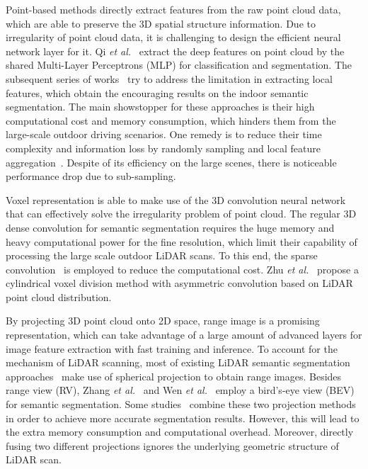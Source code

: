 \documentclass[letterpaper, 10 pt, journal, twoside]{ieeetran}
\begin{document}
Point-based methods directly extract features from the raw point cloud data, which are able to preserve the 3D spatial structure information. Due to irregularity of point cloud data, it is challenging to design the efficient neural network layer for it. Qi \textit{et al.}~\cite{qi2017pointnet} extract the deep features on point cloud by the shared Multi-Layer Perceptrons (MLP) for classification and segmentation. The subsequent series of works~\cite{qi2017pointnet++,thomas2019kpconv} try to address the limitation in extracting local features, which obtain the encouraging results on the indoor semantic segmentation. The main showstopper for these approaches is their high computational cost and memory consumption, which hinders them from the large-scale outdoor driving scenarios. One remedy is to reduce their time complexity and information loss by randomly sampling and local feature aggregation~\cite{hu2020randla}. Despite of its efficiency on the large scenes, there is noticeable performance drop due to sub-sampling.


Voxel representation is able to make use of the 3D convolution neural network that can effectively solve the irregularity problem of point cloud. The regular 3D dense convolution for semantic segmentation requires the huge memory and heavy computational power for the fine resolution, which limit their capability of processing the large scale outdoor LiDAR scans. To this end, the sparse convolution~\cite{graham20183d, yan2021sparse} is employed to reduce the computational cost. Zhu \textit{et al.}~\cite{zhu2021cylindrical} propose a cylindrical voxel division method with asymmetric convolution based on LiDAR point cloud distribution.


By projecting 3D point cloud onto 2D space, range image is a promising representation, which can take advantage of a large amount of advanced layers for image feature extraction with fast training and inference. To account for the mechanism of LiDAR scanning, most of existing LiDAR semantic segmentation approaches~\cite{milioto2019rangenet++,cortinhal2020salsanext,xu2020squeezesegv3, alonso20203d} make use of spherical projection to obtain range images. Besides range view (RV), Zhang \textit{et al.}~\cite{zhang2020polarnet} and Wen \textit{et al.}~\cite{wen2022hybrid} employ a bird's-eye view (BEV) for semantic segmentation. Some studies~\cite{liong2020amvnet,gerdzhev2021tornado} combine these two projection methods in order to achieve more accurate segmentation results. However, this will lead to the extra memory consumption and computational overhead. Moreover, directly fusing two different projections ignores the underlying geometric structure of LiDAR scan.  
\end{document}
